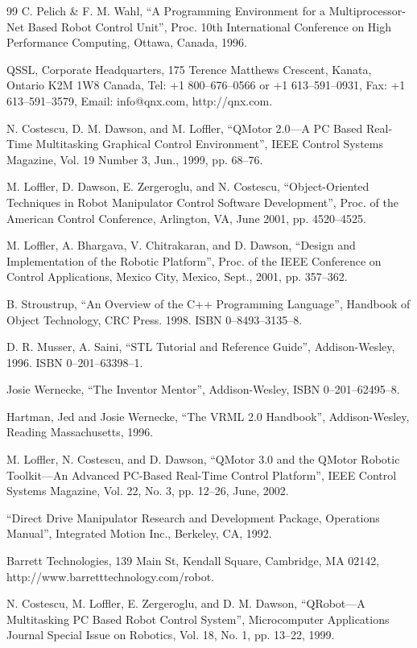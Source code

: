 \documentclass[UTF8,a4paper,12pt]{ctexart}
\begin{document}
\begin{thebibliography}{99}
 C. Pelich \& F. M. Wahl, ``A Programming Environment for a Multiprocessor-Net Based Robot Control Unit'', Proc. 10th International Conference on High Performance Computing, Ottawa, Canada, 1996.

 QSSL, Corporate Headquarters, 175 Terence Matthews Crescent, Kanata, Ontario K2M 1W8 Canada, Tel: +1 800--676--0566 or +1 613--591--0931, Fax: +1 613--591--3579, Email: info@qnx.com, http://qnx.com.

 N. Costescu, D. M. Dawson, and M. Loffler, ``QMotor 2.0---A PC Based Real-Time Multitasking Graphical Control Environment'', IEEE Control Systems Magazine, Vol. 19 Number 3, Jun., 1999, pp. 68--76.

 M. Loffler, D. Dawson, E. Zergeroglu, and N. Costescu, ``Object-Oriented Techniques in Robot Manipulator Control Software Development'', Proc. of the American Control Conference, Arlington, VA, June 2001, pp. 4520--4525.

 M. Loffler, A. Bhargava, V. Chitrakaran, and D. Dawson, ``Design and Implementation of the Robotic Platform'', Proc. of the IEEE Conference on Control Applications, Mexico City, Mexico, Sept., 2001, pp. 357--362.

 B. Stroustrup, ``An Overview of the C++ Programming Language'', Handbook of Object Technology, CRC Press. 1998. ISBN 0--8493--3135--8.

 D. R. Musser, A. Saini, ``STL Tutorial and Reference Guide'', Addison-Wesley, 1996. ISBN 0--201--63398--1.

 Josie Wernecke, ``The Inventor Mentor'', Addison-Wesley, ISBN 0--201--62495--8.

 Hartman, Jed and Josie Wernecke, ``The VRML 2.0 Handbook'', Addison-Wesley, Reading Massachusetts, 1996.

 M. Loffler, N. Costescu, and D. Dawson, ``QMotor 3.0 and the QMotor Robotic Toolkit---An Advanced PC-Based Real-Time Control Platform'', IEEE Control Systems Magazine, Vol. 22, No. 3, pp. 12--26, June, 2002.

 ``Direct Drive Manipulator Research and Development Package, Operations Manual'', Integrated Motion Inc., Berkeley, CA, 1992.

 Barrett Technologies, 139 Main St, Kendall Square, Cambridge, MA 02142, http://www.barretttechnology.com/robot.

 N. Costescu, M. Loffler, E. Zergeroglu, and D. M. Dawson, ``QRobot---A Multitasking PC Based Robot Control System'', Microcomputer Applications Journal Special Issue on Robotics, Vol. 18, No. 1, pp. 13--22, 1999.

\end{thebibliography}

\ifstandalone
  
\end{document}
